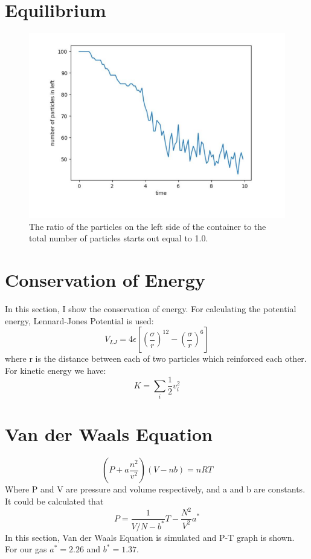 \documentclass{article}
\begin{document}
\section{Equilibrium}
\begin{figure}[H]
    \centering
    \includegraphics[width=1\linewidth]{gas2.PNG}
    \vspace{-1cm}
    \caption{The ratio of the particles on the left side of the container to the total number of particles starts out equal to 1.0.}
\end{figure}
\section{Conservation of Energy}
In this section, I show the conservation of energy. For calculating the potential energy, Lennard-Jones Potential is used:\\
\begin{equation}
    V_{LJ}=4\epsilon[(\frac{\sigma}{r})^{12}-(\frac{\sigma}{r})^6]
\end{equation}
where r is the distance between each of two particles which reinforced each other.\\
For kinetic energy we have:\\
\begin{equation}
    K = \sum_i \frac{1}{2} v_i^2
\end{equation}
\section{Van der Waals Equation}
\begin{equation}
    (P+a\frac{n^2}{v^2})(V-nb)=nRT
\end{equation}
Where P and V are pressure and volume respectively, and a and b are constants. It could be calculated that\\
\begin{equation}
    P=\frac{1}{V/N-b^*}T-\frac{N^2}{V^2}a^*
\end{equation}
In this section, Van der Waals Equation is simulated and P-T graph is shown. For our gas $a^*=2.26$ and $b^*=1.37$.
\end{document}
